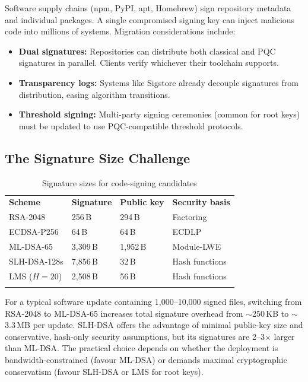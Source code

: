 Software supply chains (npm, PyPI, apt, Homebrew) sign repository metadata and individual packages.  A single compromised signing key can inject malicious code into millions of systems.  Migration considerations include:
\begin{itemize}
\item \textbf{Dual signatures:} Repositories can distribute both classical and PQC signatures in parallel.  Clients verify whichever their toolchain supports.
\item \textbf{Transparency logs:} Systems like Sigstore already decouple signatures from distribution, easing algorithm transitions.
\item \textbf{Threshold signing:} Multi-party signing ceremonies (common for root keys) must be updated to use PQC-compatible threshold protocols.
\end{itemize}

\subsection{The Signature Size Challenge}
\label{subsec:sig-size-challenge}

\begin{table}[t]
\caption{Signature sizes for code-signing candidates}
\label{tab:codesign-sizes}
\begin{tabular}{p{3.5cm}p{2.5cm}p{2.5cm}p{3cm}}
\hline\noalign{\smallskip}
\textbf{Scheme} & \textbf{Signature} & \textbf{Public key} & \textbf{Security basis} \\
\noalign{\smallskip}\svhline\noalign{\smallskip}
RSA-2048 & 256\,B & 294\,B & Factoring \\
ECDSA-P256 & 64\,B & 64\,B & ECDLP \\
ML-DSA-65 & 3{,}309\,B & 1{,}952\,B & Module-LWE \\
SLH-DSA-128s & 7{,}856\,B & 32\,B & Hash functions \\
LMS ($H{=}20$) & 2{,}508\,B & 56\,B & Hash functions \\
\noalign{\smallskip}\hline
\end{tabular}
\end{table}

For a typical software update containing 1{,}000--10{,}000 signed files, switching from RSA-2048 to ML-DSA-65 increases total signature overhead from $\sim$250\,KB to $\sim$3.3\,MB per update.  SLH-DSA offers the advantage of minimal public-key size and conservative, hash-only security assumptions, but its signatures are 2--3$\times$ larger than ML-DSA.  The practical choice depends on whether the deployment is bandwidth-constrained (favour ML-DSA) or demands maximal cryptographic conservatism (favour SLH-DSA or LMS for root keys).

